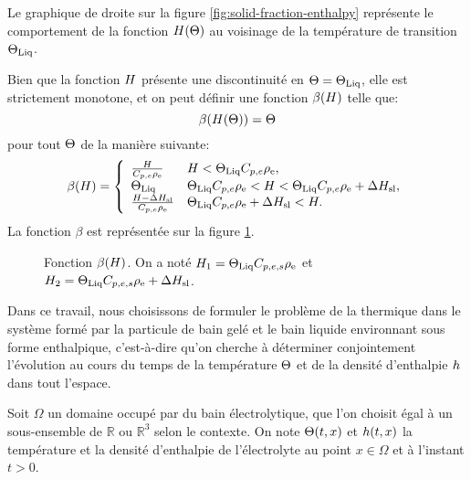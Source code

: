 Le graphique de droite sur la figure \ref{fig:solid-fraction-enthalpy}
représente le comportement de la fonction $H(\Theta)$ au
voisinage de la température de transition $\Theta_\text{Liq}$.

Bien que la fonction $H$ présente une discontinuité en
$\Theta = \Theta_\text{Liq}$, elle est strictement monotone, et on peut
définir une fonction $\beta(H)$ telle que:
\begin{equation}
\beta(H(\Theta)) = \Theta
\end{equation}
pour tout $\Theta$ de la manière suivante:
\begin{equation}
  \beta(\enthalpy) = \left\{
  \begin{array}{ll}
    \frac{\enthalpy}{\electrolytehc\electrolytedensity} %
      & \enthalpy < \tliq \electrolytehc\electrolytedensity,\\
    \tliq %
      & \tliq \electrolytehc\electrolytedensity < \enthalpy < \tliq \electrolytehc\electrolytedensity + \fusionenthalpy,\\
    \frac{\enthalpy - \fusionenthalpy}{\electrolytehc\electrolytedensity} %
      & \tliq\electrolytehc\electrolytedensity + \fusionenthalpy < \enthalpy.\\
  \end{array}
  \right.
\end{equation}
La fonction $\beta$ est représentée sur la figure \ref{fig:beta}.
\begin{figure}
  \begin{center}
    
    \caption{Fonction $\beta(H)$. On a noté $H_1 =
      \Theta_\text{Liq}C_{p,e,s}\rho_\mathrm{e}$ et $H_2 =
      \Theta_\text{Liq}C_{p,e,s}\rho_\mathrm{e} + \Delta H_\mathrm{sl}$.}
    \label{fig:beta}
  \end{center}
\end{figure}

Dans ce travail, nous choisissons de formuler le problème de la
thermique dans le système formé par la particule de bain gelé et le
bain liquide environnant sous forme enthalpique, c'est-à-dire qu'on
cherche à déterminer conjointement l'évolution au cours du temps de la
température $\Theta$ et de la densité d'enthalpie
$h$ dans tout l'espace.

Soit $\Omega$ un domaine occupé par du bain électrolytique, que l'on
choisit égal à un sous-ensemble de $\mathbb R$ ou $\mathbb R^3$ selon
le contexte. On note $\Theta(t, x)$ et $h(t, x)$
la température et la densité d'enthalpie de l'électrolyte au point $x
\in \Omega$ et à l'instant $t > 0$.

